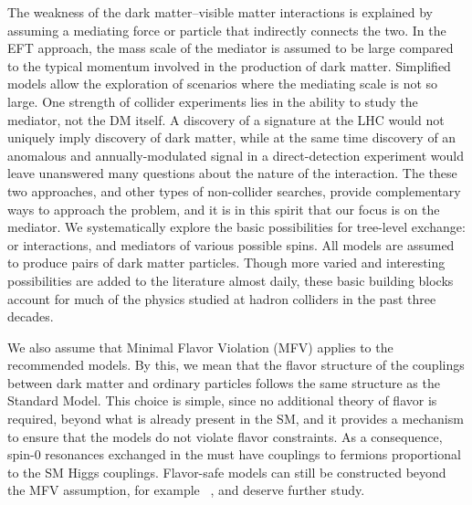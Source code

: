The weakness of the dark matter--visible matter interactions is explained
by assuming a mediating force or particle that indirectly connects the
two.  In the EFT approach, the mass scale of the mediator is assumed
to be large compared to the typical momentum involved in the production
of dark matter.
Simplified models allow the exploration of scenarios where the
mediating scale is not so large.
One strength of collider experiments lies in the ability to
study the mediator, not the DM itself. A discovery of a \MET signature
at the LHC would not uniquely imply discovery of dark matter, while at
the same time discovery of an anomalous and annually-modulated signal
in a direct-detection experiment would leave unanswered many questions
about the nature of the interaction. The these two approaches, and
other types of non-collider searches, provide complementary ways to
approach the problem, and it is in this spirit that our focus is on
the mediator. We systematically explore the basic possibilities for
tree-level exchange: \schannel or \tchannel interactions, and
mediators of various possible spins.
All models are assumed to produce pairs of dark matter particles.
Though more varied and
interesting possibilities are added to the literature almost daily,
these basic building blocks account for much of the physics studied at
hadron colliders in the past three decades.


We also assume that Minimal Flavor Violation (MFV) \cite{Chivukula:1987py,Hall:1990ac,Buras:2000dm,D'Ambrosio:2002ex} applies to the
recommended models. By this, we mean that the flavor structure of the
couplings between dark matter and ordinary particles follows the same
structure as the Standard Model. This choice is simple, since no
additional theory of flavor is required, beyond what is already
present in the SM, and it provides a mechanism to ensure that the
models do not violate flavor constraints.  As a consequence, spin-0
resonances exchanged in the \schannel must have couplings to fermions proportional to the SM Higgs couplings. Flavor-safe models can still be constructed beyond the MFV
assumption, for example ~\cite{Agrawal:2014aoa}, and deserve further study.

